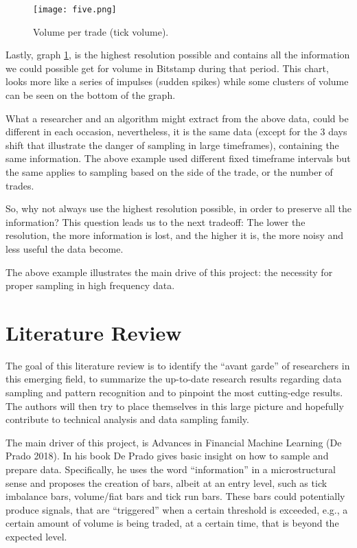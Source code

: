 \begin{figure}[h]
    \centering
    \texttt{[image: five.png]}
    \caption{Volume per trade (tick volume).}
    \label{fig:tick_vol}
\end{figure}

Lastly, graph \ref{fig:tick_vol}, is the highest resolution possible and contains all the information we could possible get for volume in Bitstamp during that period. This chart, looks more like a series of impulses (sudden spikes) while some clusters of volume can be seen on the bottom of the graph. 

What a researcher and an algorithm might extract from the above data, could be different in
each occasion, nevertheless, it is the same data (except for the 3 days shift that illustrate the danger of sampling in large timeframes), containing the same information. The above example used different fixed timeframe intervals but the same applies to sampling based on the side of the trade, or the number of trades. 

So, why not always use the highest resolution possible, in order to preserve all the information? This question leads us to the next tradeoff: The lower the resolution, the more information is lost, and the higher it is, the more noisy and less useful the data become.

The above example illustrates the main drive of this project: the necessity for proper sampling in high frequency data.


\section{Literature Review}

The goal of this literature review is to identify the “avant garde” of researchers in this
emerging field, to summarize the up-to-date research results regarding data sampling and
pattern recognition and to pinpoint the most cutting-edge results. The authors will then try to
place themselves in this large picture and hopefully contribute to technical analysis and data
sampling family.

The main driver of this project, is Advances in Financial Machine Learning (De Prado
2018). In his book De Prado gives basic insight on how to sample and prepare data. Specifically,
he uses the word “information” in a microstructural sense and proposes the creation of bars,
albeit at an entry level, such as tick imbalance bars, volume/fiat bars and tick run bars. These
bars could potentially produce signals, that are “triggered” when a certain threshold is
exceeded, e.g., a certain amount of volume is being traded, at a certain time, that is beyond the
expected level.

